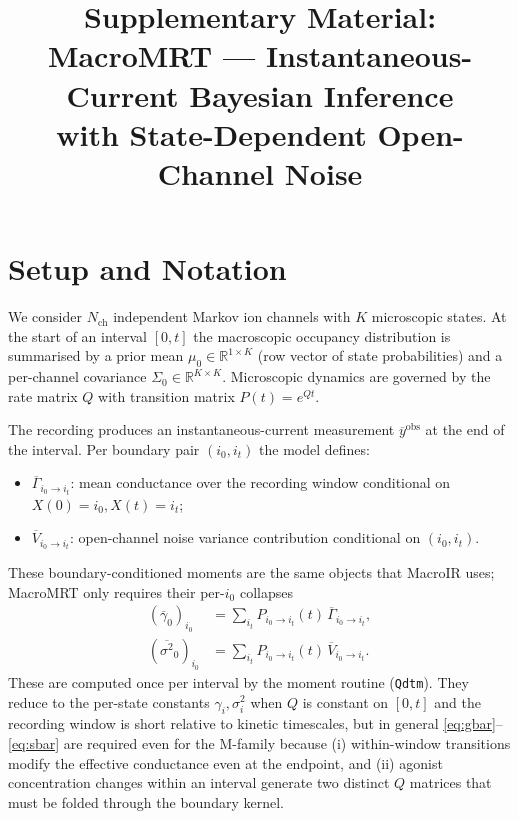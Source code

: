 \documentclass[11pt]{article}
\title{Supplementary Material:\\
MacroMRT --- Instantaneous-Current Bayesian Inference\\
with State-Dependent Open-Channel Noise}
\author{}
\date{}
\begin{document}
\maketitle

\newcommand{\E}{\mathbb{E}}
\newcommand{\Var}{\operatorname{Var}}
\newcommand{\diag}{\operatorname{diag}}
\newcommand{\Nch}{N_{\mathrm{ch}}}
\newcommand{\gbar}{\overline{\gamma}_0}
\newcommand{\sbar}{\overline{\sigma^2}_0}

\section{Setup and Notation}

We consider $\Nch$ independent Markov ion channels with $K$ microscopic
states. At the start of an interval $[0,t]$ the macroscopic occupancy
distribution is summarised by a prior mean $\mu_0\in\mathbb{R}^{1\times K}$
(row vector of state probabilities) and a per-channel covariance
$\Sigma_0\in\mathbb{R}^{K\times K}$. Microscopic dynamics are governed
by the rate matrix $Q$ with transition matrix $P(t)=e^{Qt}$.

The recording produces an instantaneous-current measurement
$\overline{y}^{\mathrm{obs}}$ at the end of the interval. Per
boundary pair $(i_0,i_t)$ the model defines:
\begin{itemize}
  \item $\overline{\Gamma}_{i_0\to i_t}$: mean conductance over the
        recording window conditional on $X(0)=i_0,X(t)=i_t$;
  \item $\overline{V}_{i_0\to i_t}$: open-channel noise variance
        contribution conditional on $(i_0,i_t)$.
\end{itemize}

These boundary-conditioned moments are the same objects that MacroIR
uses; MacroMRT only requires their per-$i_0$ collapses
\begin{align}
  (\gbar)_{i_0}
  &= \sum_{i_t} P_{i_0\to i_t}(t)\,\overline{\Gamma}_{i_0\to i_t},
  \label{eq:gbar}\\
  (\sbar)_{i_0}
  &= \sum_{i_t} P_{i_0\to i_t}(t)\,\overline{V}_{i_0\to i_t}.
  \label{eq:sbar}
\end{align}
These are computed once per interval by the moment routine
(\texttt{Qdtm}). They reduce to the per-state constants
$\gamma_i,\sigma^2_i$ when $Q$ is constant on $[0,t]$ and the recording
window is short relative to kinetic timescales, but in general
\eqref{eq:gbar}--\eqref{eq:sbar} are required even for the M-family
because (i) within-window transitions modify the effective conductance
even at the endpoint, and (ii) agonist concentration changes within an
interval generate two distinct $Q$ matrices that must be folded through
the boundary kernel.
\end{document}

